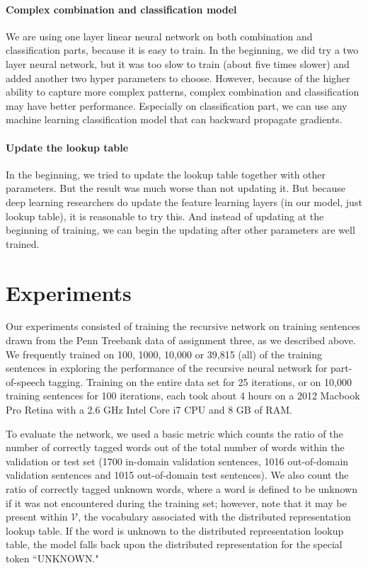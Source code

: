 \documentclass[11pt]{article}
\begin{document}
\paragraph{Complex combination and classification model}
We are using one layer linear neural network on both combination and classification parts, because it is easy to train. In the beginning, we did try a two layer neural network, but it was too slow to train (about five times slower) and added another two hyper parameters to choose. However, because of the higher ability to capture more complex patterns, complex combination and classification may have better performance. Especially on classification part, we can use any machine learning classification model that can backward propagate gradients.

\paragraph{Update the lookup table}
In the beginning, we tried to update the lookup table together with other parameters. But the result was much worse than not updating it. But because deep learning researchers do update the feature learning layers (in our model, just lookup table), it is reasonable to try this. And instead of updating at the beginning of training, we can begin the updating after other parameters are well trained.

\section{Experiments}

Our experiments consisted of training the recursive network on training sentences drawn from the Penn Treebank data of assignment three, as we described above. We frequently trained on 100, 1000, 10,000 or 39,815 (all) of the training sentences in exploring the performance of the recursive neural network for part-of-speech tagging. Training on the entire data set for 25 iterations, or on 10,000 training sentences for 100 iterations, each took about 4 hours on a 2012 Macbook Pro Retina with a 2.6 GHz Intel Core i7 CPU and 8 GB of RAM.

To evaluate the network, we used a basic metric which counts the ratio of the number of correctly tagged words out of the total number of words within the validation or test set (1700 in-domain validation sentences, 1016 out-of-domain validation sentences and 1015 out-of-domain test sentences). We also count the ratio of correctly tagged unknown words, where a word is defined to be unknown if it was not encountered during the training set; however, note that it may be present within $\mathcal{V}$, the vocabulary associated with the distributed representation lookup table. If the word is unknown to the distributed representation lookup table, the model falls back upon the distributed representation for the special token ``UNKNOWN."
\end{document}
